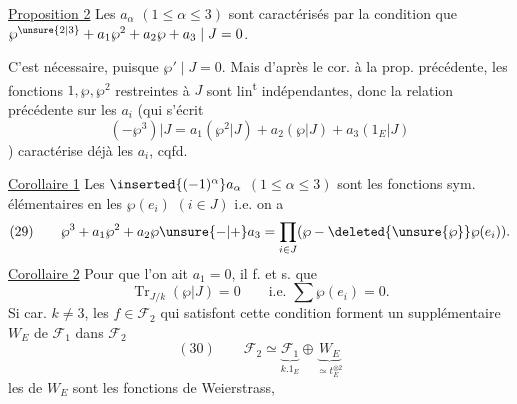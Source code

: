 \uline{Proposition 2} Les $a_\alpha$ $(1\leq\alpha\leq3)$ sont caractérisés par
la condition que $\wp^{\unsure{2|3}}+a_1\wp^2+a_2\wp+a_3\mid J=0$.

C'est nécessaire, puisque $\wp'\mid J=0$. Mais
d'après le cor. à la prop. précédente, les
fonctions $1,\wp,\wp^2$ restreintes à $J$ sont lin\textsuperscript{t}
indépendantes, donc la relation précédente
sur les $a_i$ (qui s'écrit
\[
(-\wp^3)|J=a_1(\wp^2|J)+a_2(\wp|J)+a_3(1_E|J)
\]
)
caractérise déjà les $a_i$, cqfd.

\uline{Corollaire 1} Les $\inserted{(-1)^\alpha}a_\alpha$ $(1\leq\alpha\leq3)$ sont les fonctions
sym. élémentaires en les $\wp(e_i)$ $(i\in J)$
i.e. on a
\[
(29)\qquad\wp^3+a_1\wp^2+a_2\wp\unsure{-|+}a_3
=\prod_{i\in J}(\wp-\deleted{\unsure{\wp}}\wp(e_i)).
\]
\uline{Corollaire 2} Pour que l'on ait $a_1=0$, il f. et s.
que
\[
\operatorname{Tr}_{J/k}(\wp|J)=0\qquad\text{i.e. }\sum\wp(e_i)=0.
\]
Si car. $k\ne3$, les $f\in\mathcal F_2$ qui satisfont cette
condition forment un supplémentaire
$W_E$ de $\mathcal F_1$ dans $\mathcal F_2$
\[
(30)\qquad\mathcal F_2\simeq\underbrace{\mathcal F_1}_{k.1_E}\oplus\underbrace{W_E}_{\simeq t_E^{\otimes2}}
\]
les  de $W_E$ sont  les fonctions de Weierstrass,

